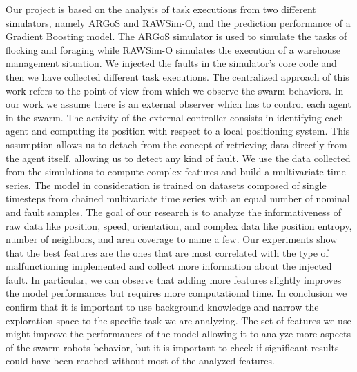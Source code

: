 \documentclass[../../Thesis.tex]{subfiles}
\begin{document}
	Our project is based on the analysis of task executions from two different simulators, namely ARGoS and RAWSim-O, and the prediction performance of a Gradient Boosting model. The ARGoS simulator is used to simulate the tasks of flocking and foraging while RAWSim-O simulates the execution of a warehouse management situation. We injected the faults in the simulator's core code and then we have collected different task executions. The centralized approach of this work refers to the point of view from which we observe the swarm behaviors. In our work we assume there is an external observer which has to control each agent in the swarm. The activity of the external controller consists in identifying each agent and computing its position with respect to a local positioning system. This assumption allows us to detach from the concept of retrieving data directly from the agent itself, allowing us to detect any kind of fault. We use the data collected from the simulations to compute complex features and build a multivariate time series. The model in consideration is trained on datasets composed of single timesteps from chained multivariate time series with an equal number of nominal and fault samples. The goal of our research is to analyze the informativeness of raw data like position, speed, orientation, and complex data like position entropy, number of neighbors, and area coverage to name a few. Our experiments show that the best features are the ones that are most correlated with the type of malfunctioning implemented and collect more information about the injected fault. In particular,  we can observe that adding more features slightly improves the model performances but requires more computational time. In conclusion we confirm that it is important to use background knowledge and narrow the exploration space to the specific task we are analyzing. The set of features we use might improve the performances of the model allowing it to analyze more aspects of the swarm robots behavior, but it is important to check if significant results could have been reached without most of the analyzed features.\\
	
\end{document}

